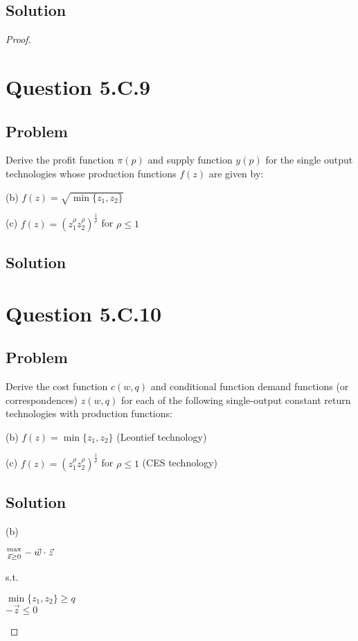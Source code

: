 \documentclass[10pt, a4paper]{article}
\begin{document}
    \subsection{Solution}
    \begin{proof}
      
  \section{Question 5.C.9}
    \subsection{Problem}
      Derive the profit function $\pi(p)$ and supply function $y(p)$ for the single output technologies whose production functions $f(z)$ are given by:

      (b) $f(z)=\sqrt{\min\{z_1,z_2\}}$

      (c) $f(z)=(z_1^{\rho}z_2^{\rho})^{\frac{1}{\rho}}$ for $\rho\leq1$ 
    \subsection{Solution}
      
  \section{Question 5.C.10}
    \subsection{Problem}
      Derive the cost function $c(w,q)$ and conditional function demand functions (or correspondences) $z(w,q)$ for each of the following single-output constant return technologies with production functions:

      (b) $f(z)=\min\{z_1,z_2\}$ (Leontief technology)
        
      (c) $f(z)=(z_1^{\rho}z_2^{\rho})^{\frac{1}{\rho}}$ for $\rho\leq1$ (CES technology) 
    \subsection{Solution}
      (b) 
      \begin{center}
        ${\max\atop{\vec{z}\geq0}}-\vec{w}\cdot\vec{z}$
      \end{center}
      s.t.
      \begin{center}
        $\min\{z_1,z_2\}\geq q$ \\
        $-\vec{z}\leq0$ \\
      \end{center}


\end{proof}
\end{document}
